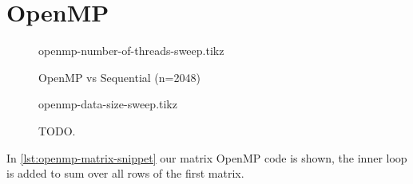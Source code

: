 \documentclass[final]{report}
\begin{document}
\chapter{OpenMP}
\begin{figure}[H]
\centering
    \setlength\figureheight{8cm}
    \setlength\figurewidth{\linewidth}
    {openmp-number-of-threads-sweep.tikz}
    \caption{OpenMP vs Sequential (n=2048)}
    \label{fig:openmp-number-of-threads-sweep}
\end{figure}

\begin{figure}[H]
\centering
    \setlength\figureheight{8cm}
    \setlength\figurewidth{\linewidth}
    {openmp-data-size-sweep.tikz}
    \caption{TODO.}
    \label{fig:openmp-data-size-sweep}
\end{figure}

In \cref{lst:openmp-matrix-snippet} our matrix OpenMP code is shown, the inner loop is added to sum over all rows of the first matrix.
\end{document}
